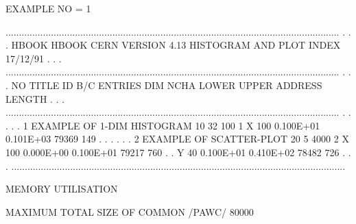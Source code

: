 \begin{Listing}
 EXAMPLE NO = 1
 
 .............................................................................................................................
 .                                                                                                                           .
 .   HBOOK   HBOOK  CERN            VERSION   4.13       HISTOGRAM AND PLOT INDEX                             17/12/91       .
 .                                                                                                                           .
 .............................................................................................................................
 .                                                                                                                           .
 .  NO                     TITLE                      ID  B/C  ENTRIES DIM   NCHA     LOWER       UPPER       ADDRESS LENGTH .
 .                                                                                                                           .
 .............................................................................................................................
 .                                                                                                                           .
 .                                                                                                                           .
 .   1  EXAMPLE OF 1-DIM HISTOGRAM                    10  32      100  1  X   100   0.100E+01   0.101E+03       79369    149 .
 .                                                                                                                           .
 .                                                                                                                           .
 .   2  EXAMPLE OF SCATTER-PLOT                       20   5     4000  2  X   100   0.000E+00   0.100E+01       79217    760 .
 .                                                                        Y    40   0.100E+01   0.410E+02       78482    726 .
 .                                                                                                                           .
 .............................................................................................................................

 MEMORY UTILISATION

      MAXIMUM TOTAL SIZE OF COMMON /PAWC/            80000


\end{Listing}
